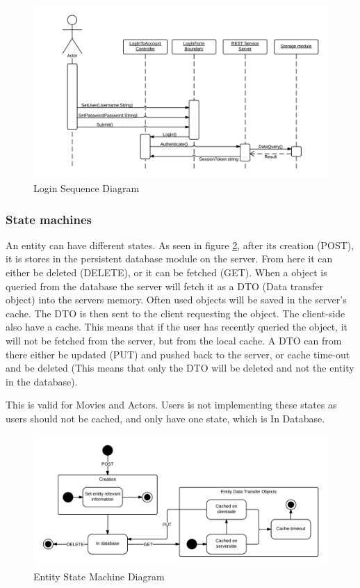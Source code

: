 \begin{figure}[H]
\includegraphics[width=\linewidth]{img/LoginSequenceDiagram.png}
\caption{Login Sequence Diagram}
\label{fig:Login Sequence Diagram}
\end{figure}

\subsubsection{State machines}
An entity can have different states. As seen in figure \ref{fig:Entity State Machine Diagram}, after its creation (POST), it is stores in the persistent database module on the server. From here it can either be deleted (DELETE), or it can be fetched (GET). When a object is queried from the database the server will fetch it as a DTO (Data transfer object) into the servers memory. Often used objects will be saved in the server's cache. The DTO is then sent to the client requesting the object. The client-side also have a cache. This means that if the user has recently queried the object, it will not be fetched from the server, but from the local cache. A DTO can from there either be updated (PUT) and pushed back to the server, or cache time-out and be deleted (This means that only the DTO will be deleted and not the entity in the database).

This is valid for Movies and Actors. Users is not implementing these states as users should not be cached, and only have one state, which is In Database.   

\begin{figure}[H]
\includegraphics[width=\linewidth]{img/EntityStateMachineDiagram.png}
\caption{Entity State Machine Diagram}
\label{fig:Entity State Machine Diagram}
\end{figure}
\newpage

